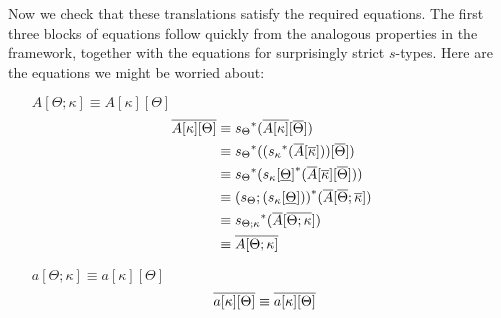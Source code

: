 \documentclass[10pt]{article}
\theoremstyle{definition}
\newcommand\St[2]{\ensuremath{{#1}^*(#2)}}
\begin{document}
Now we check that these translations satisfy the required equations. The first three blocks of equations follow quickly from the analogous properties in the framework, together with the equations for surprisingly strict $s$-types. Here are the equations we might be worried about:
\begin{enumerate}[style = multiline, labelwidth = 80pt]
\item[{$A[\Theta ; \kappa] \equiv A[\kappa][\Theta]$}] 
\begin{align*}
\upstairs{A[\kappa][\Theta]}
&\equiv \St{s_{\Theta}}{\upstairs{A[\kappa]}[\upstairs{\Theta}]} \\
&\equiv \St{s_{\Theta}}{(\St{s_{\kappa}}{\upstairs{A}[\upstairs{\kappa}]})[\upstairs{\Theta}]} \\
&\equiv \St{s_\Theta}{\St{s_\kappa[\downstairs{\Theta}]}{\upstairs{A}[ \upstairs{\kappa}][\upstairs{\Theta}]}} \\
&\equiv \St{(s_\Theta; (s_\kappa[\downstairs{\Theta}]))}{\upstairs{A}[\upstairs{\Theta} ; \upstairs{\kappa}]} \\
&\equiv \St{s_{\Theta ; \kappa}}{\upstairs{A}[\upstairs{\Theta ; \kappa}]} \\
&\equiv \upstairs{A[\Theta ; \kappa]}
\end{align*}

\item[{$a[\Theta ; \kappa] \equiv a[\kappa][\Theta]$}] 
\begin{align*}
\overline{a[\kappa][\Theta]}
&\equiv \overline{a[\kappa][\Theta]}
\end{align*}


\end{enumerate}
\end{document}
